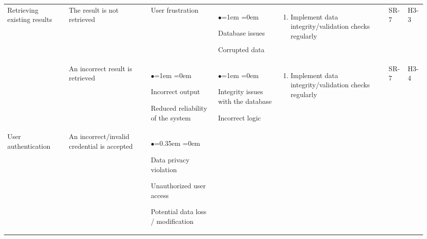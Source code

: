 \documentclass{article}
\begin{document}
\begin{table}[H]
    \centering
    \begin{tabularx}{\textwidth}{|P{2cm}|P{2cm}|P{2cm}|P{2cm}|P{3.45cm}|P{1cm}|P{1cm}|}
        \hline
        Retrieving existing results & The result is not retrieved & User frustration & 
        \begin{list}{$\bullet$}{\leftmargin=1em \itemindent=0em}
            \item Database issues
            \item Corrupted data
        \end{list}
        & 
        \begin{enumerate}[label=(\alph*)]{\leftmargin=1em \itemindent=0em}
            \item Implement data integrity/validation checks regularly
        \end{enumerate}
        & SR-7 & H3-3\\
        & An incorrect result is retrieved & 
         \begin{list}{$\bullet$}{\leftmargin=1em \itemindent=0em}
            \item Incorrect output
            \item Reduced reliability of the system
        \end{list}
        & 
        \begin{list}{$\bullet$}{\leftmargin=1em \itemindent=0em}
            \item Integrity issues with the database
            \item Incorrect logic
        \end{list}
        & 
        \begin{enumerate}[label=(\alph*)]{\leftmargin=1em \itemindent=0em}
            \item Implement data integrity/validation checks regularly
        \end{enumerate}
        & SR-7 & H3-4\\
        \hline
        User authentication & An incorrect/invalid credential is accepted & 
        \begin{list}{$\bullet$}{\leftmargin=0.35em \itemindent=0em}
            \item Data privacy violation
            \item Unauthorized user access
            \item Potential data loss / modification
        \end{list}

\end{tabularx}
\end{table}
\end{document}
